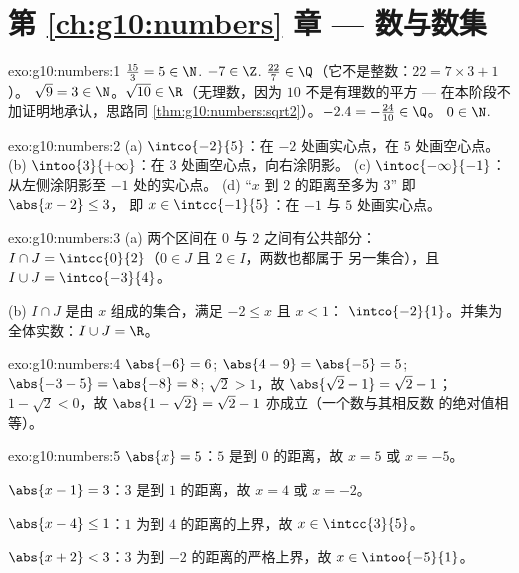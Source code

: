 \section*{第 \ref{ch:g10:numbers} 章 --- 数与数集}

\begin{solution}{exo:g10:numbers:1}
$\frac{15}{3} = 5 \in \N$. \quad $-7 \in \Z$. \quad
$\frac{22}{7} \in \Q$（它不是整数：$22 = 7 \times 3 + 1$）。
\quad $\sqrt 9 = 3 \in \N$。\quad $\sqrt{10} \in \R$（无理数，因为
$10$ 不是有理数的平方 --- 在本阶段不加证明地承认，思路同
\cref{thm:g10:numbers:sqrt2}）。\quad $-2.4 = -\frac{24}{10} \in \Q$。
\quad $0 \in \N$.
\end{solution}

\begin{solution}{exo:g10:numbers:2}
(a) $\intco{-2}{5}$：在 $-2$ 处画实心点，在 $5$ 处画空心点。
(b) $\intoo{3}{+\infty}$：在 $3$ 处画空心点，向右涂阴影。
(c) $\intoc{-\infty}{-1}$：从左侧涂阴影至
$-1$ 处的实心点。
(d) “$x$ 到 $2$ 的距离至多为 $3$” 即 $\abs{x - 2} \leq 3$，
即 $x \in \intcc{-1}{5}$：在 $-1$ 与 $5$ 处画实心点。
\end{solution}

\begin{solution}{exo:g10:numbers:3}
(a) 两个区间在 $0$ 与 $2$ 之间有公共部分：
$I \cap J = \intcc{0}{2}$（$0 \in J$ 且 $2 \in I$，两数也都属于
另一集合），且 $I \cup J = \intco{-3}{4}$。

(b) $I \cap J$ 是由 $x$ 组成的集合，满足 $-2 \leq x$ 且 $x < 1$：
$\intco{-2}{1}$。并集为全体实数：$I \cup J = \R$。
\end{solution}

\begin{solution}{exo:g10:numbers:4}
$\abs{-6} = 6$; \quad $\abs{4 - 9} = \abs{-5} = 5$; \quad
$\abs{-3 - 5} = \abs{-8} = 8$; \quad
$\sqrt 2 > 1$，故 $\abs{\sqrt2 - 1} = \sqrt2 - 1$；\quad
$1 - \sqrt2 < 0$，故 $\abs{1 - \sqrt2} = \sqrt2 - 1$ 亦成立（一个数与其相反数
的绝对值相等）。
\end{solution}

\begin{solution}{exo:g10:numbers:5}
$\abs{x} = 5$：$5$ 是到 $0$ 的距离，故 $x = 5$ 或 $x = -5$。

$\abs{x - 1} = 3$：$3$ 是到 $1$ 的距离，故 $x = 4$ 或 $x = -2$。

$\abs{x - 4} \leq 1$：$1$ 为到 $4$ 的距离的上界，故
$x \in \intcc{3}{5}$。

$\abs{x + 2} < 3$：$3$ 为到 $-2$ 的距离的严格上界，故
$x \in \intoo{-5}{1}$。
\end{solution}

